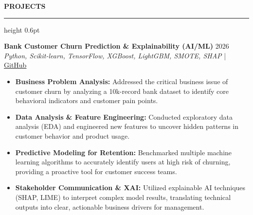 ﻿\documentclass{resume}
\renewcommand{\sectionskip}{\vspace{5pt}}
\renewcommand{\sectionlineskip}{\vspace{3pt}}
\renewenvironment{rSection}[1]{
  \sectionskip
  {\color{headerblue}\textbf{\MakeUppercase{#1}}}
  \sectionlineskip
  {\color{rulegray}\hrule height 0.6pt}
  \vspace{0pt}
  \begin{list}{}{
    \setlength{\leftmargin}{0em}
    \setlength{\topsep}{0pt}
    \setlength{\partopsep}{0pt}
    \setlength{\parsep}{0pt}
    \setlength{\itemsep}{0pt}
  }
  \item[]
}{
  \end{list}
}
\begin{document}
\begin{rSection}{Projects}
    \item \textbf{Bank Customer Churn Prediction \& Explainability (AI/ML)} \hfill 2026\\
    {\small \textit{Python, Scikit-learn, TensorFlow, XGBoost, LightGBM, SMOTE, SHAP}} \hfill | \href{https://github.com/ThanhThang5722/Bank-Customer-Churn-Prediction}{GitHub}
    {\small
    \begin{itemize}[itemsep=4pt, parsep=0pt, leftmargin=1.2em]
        \item \textbf{Business Problem Analysis:} Addressed the critical business issue of customer churn by analyzing a 10k-record bank dataset to identify core behavioral indicators and customer pain points.
        \item \textbf{Data Analysis \& Feature Engineering:} Conducted exploratory data analysis (EDA) and engineered new features to uncover hidden patterns in customer behavior and product usage.
        \item \textbf{Predictive Modeling for Retention:} Benchmarked multiple machine learning algorithms to accurately identify users at high risk of churning, providing a proactive tool for customer success teams.
        \item \textbf{Stakeholder Communication \& XAI:} Utilized explainable AI techniques (SHAP, LIME) to interpret complex model results, translating technical outputs into clear, actionable business drivers for management.
    \end{itemize}
    }
\end{rSection}
\end{document}
